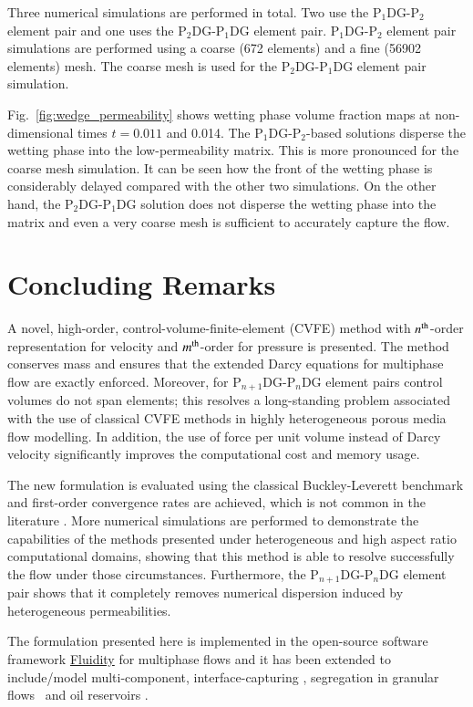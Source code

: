 \documentclass[preprint,authoryear,12pt]{elsarticle}
\newcommand{\PN}[2][error]{P$_{#1}$DG-P$_{#2}$}
\begin{document}
Three numerical simulations are performed in total. Two use the
\PN[1]{2} element pair and one uses the \PN[2]{1}DG element pair.
\PN[1]{2} element pair simulations are performed using a coarse (672
elements) and a fine (56902 elements) mesh. The coarse mesh is used
for the \PN[2]{1}DG element pair simulation.

Fig.~\ref{fig:wedge_permeability} shows wetting phase volume fraction
maps at non-dimensional times $t=0.011$ and 0.014. The \PN[1]{2}-based
solutions disperse the wetting phase into the low-permeability
matrix. This is more pronounced for the coarse mesh simulation. It can
be seen how the front of the wetting phase is considerably delayed
compared with the other two simulations. On the other hand, the
\PN[2]{1}DG solution does not disperse the wetting phase into the
matrix and even a very coarse mesh is sufficient to accurately capture
the flow.



\section{Concluding Remarks}\label{conc}
A novel, high-order, control-volume-finite-element (CVFE) method with
$n^{\rm th}$-order representation for velocity and $m^{\rm th}$-order
for pressure is presented. The method conserves mass and ensures that
the extended Darcy equations for multiphase flow are exactly
enforced. Moreover, for \PN[n+1]{n}DG element pairs control volumes
do not span elements; this resolves a long-standing problem associated
with the use of classical CVFE methods in highly heterogeneous porous
media flow modelling. In addition, the use of force per unit volume
instead of Darcy velocity significantly improves the computational
cost and memory usage.

The new formulation is evaluated using the classical Buckley-Leverett
benchmark and first-order convergence rates are achieved, which is not
common in the literature \citep[see][]{Schmid,Hoteit}. More numerical
simulations are performed to demonstrate the capabilities of the
methods presented under heterogeneous and high aspect ratio
computational domains, showing that this method is able to resolve
successfully the flow under those circumstances. Furthermore, the
\PN[n+1]{n}DG element pair shows that it completely removes numerical
dispersion induced by heterogeneous permeabilities.

The formulation presented here is implemented in the open-source
software framework
\href{http://www3.imperial.ac.uk/earthscienceandengineering/research/amcg/fluidity}{Fluidity}
for multiphase flows and it has been extended to include/model
multi-component, interface-capturing
\citep{pavlidis_2013b,pavlidis_2014,xie_2014}, segregation in granular
flows~\citep{percival_2014} and oil reservoirs
\citep{jackson_2013,mostaghimi_2015, Salinas}.
\end{document}
